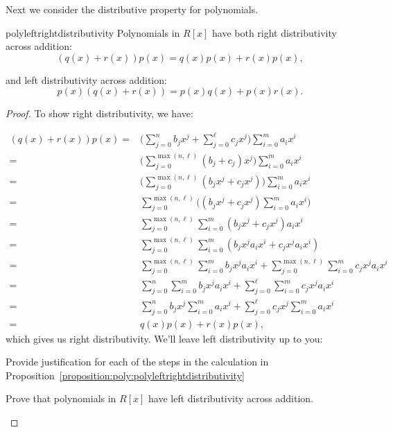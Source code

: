 Next we consider the distributive property for polynomials.

\begin{prop}{polyleftrightdistributivity} Polynomials in $R[x]$ have both right distributivity across addition:
\[(q(x)+r(x)) p(x) = q(x)p(x)+r(x)p(x),\]

and left distributivity across addition:
\[p(x)(q(x)+r(x)) = p(x)q(x)+p(x)r(x).\]

\end{prop}

\begin{proof}{}
To show right distributivity, we have:

\begin{align*}
(q(x)+r(x)) p(x)=&\bigg(\sum^{n}_{j=0} b_j x^j +  \sum^{\ell}_{j=0} c_jx^j\bigg)\sum^{m}_{i=0} a_i x^i\\
=&\bigg(\sum_{j=0}^{\max(n,\ell)} (b_j + c_j) x^j\bigg)\sum^{m}_{i=0} a_i x^i\\
=&\bigg(\sum_{j=0}^{\max(n,\ell)} (b_j x^j+ c_j x^j)\bigg)\sum^{m}_{i=0}a_ix^i\\
=&\sum_{j=0}^{\max(n,\ell)}\bigg((b_j x^j+ c_j x^j)\sum^{m}_{i=0}a_ix^i\bigg)\\
=&\sum_{j=0}^{\max(n,\ell)}\sum^{m}_{i=0} (b_j x^j+ c_j x^j)a_ix^i\\
=&\sum_{j=0}^{\max(n,\ell)}\sum^{m}_{i=0} (b_j x^ja_ix^i+ c_j x^ja_ix^i)\\
=&\sum_{j=0}^{\max(n,\ell)}\sum^{m}_{i=0} b_j x^ja_ix^i+ \sum_{j=0}^{\max(n,\ell)}\sum^{m}_{i=0}c_j x^ja_ix^i\\
=&\sum_{j=0}^{n}\sum^{m}_{i=0} b_j x^ja_ix^i+ \sum_{j=0}^{\ell}\sum^{m}_{i=0}c_j x^ja_ix^i\\
=&\sum^{n}_{j=0} b_j x^j\sum^{m}_{i=0} a_i x^i+ \sum^{\ell}_{j=0} c_jx^j \sum^{m}_{i=0} a_i x^i\\
=&q(x)p(x)+r(x)p(x),
\end{align*}
which gives us right distributivity. We'll leave left distributivity up to you:

\begin{exercise}{}
Provide justification for each of the steps in the calculation in Proposition~\ref{proposition:poly:polyleftrightdistributivity}
\end{exercise}

\begin{exercise}{}
Prove that polynomials in $R[x]$ have left distributivity across addition.
\end{exercise}
\end{proof}
